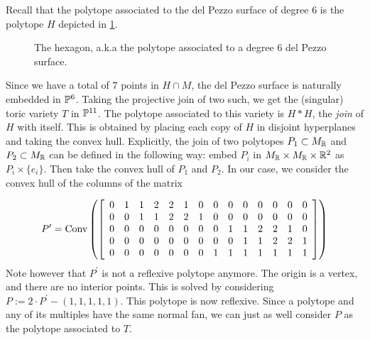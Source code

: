 \documentclass[11pt, english]{article}
\begin{document}
Recall that the polytope associated to the del Pezzo surface of degree $6$ is the polytope $H$ depicted in \ref{fig:hexagon}. 

\begin{figure}[ht]
\label{fig:hexagon}
\centering
{}
\caption{The hexagon, a.k.a the polytope associated to a degree 6 del Pezzo surface.}
\end{figure}
 
Since we have a total of $7$ points in $H \cap M$, the del Pezzo surface is naturally embedded in $\mathbb{P}^6$. Taking the projective join of two such, we get the (singular) toric variety $T$ in $\mathbb{P}^{11}$. The polytope associated to this variety is $H \ast H$, the \emph{join} of $H$ with itself. This is obtained by placing each copy of $H$ in disjoint hyperplanes and taking the convex hull. Explicitly, the join of two polytopes $P_1 \subset M_{\mathbb{R}}$ and $P_2 \subset M_{\mathbb{R}}$ can be defined in the following way: embed $P_i$ in $M_{\mathbb{R}} \times M_{\mathbb{R}} \times \mathbb{R}^2$ as $P_i \times \{e_i\}$. Then take the convex hull of $P_1$ and $P_2$. In our case, we consider the convex hull of the columns of the  matrix

\[
P^\prime = \Conv \left( \left[
\begin{array}{*{14}c}
0 & 1 & 1 & 2 & 2 & 1 & 0 & 0 & 0 & 0 & 0 & 0 & 0 & 0 \\
0 & 0 & 1 & 1 & 2 & 2 & 1 & 0 & 0 & 0 & 0 & 0 & 0 & 0 \\
0 & 0 & 0 & 0 & 0 & 0 & 0 & 0 & 1 & 1 & 2 & 2 & 1 & 0 \\
0 & 0 & 0 & 0 & 0 & 0 & 0 & 0 & 0 & 1 & 1 & 2 & 2 & 1 \\
0 & 0 & 0 & 0 & 0 & 0 & 0 & 1 & 1 & 1 & 1 & 1 & 1 & 1
\end{array} \right] \right)
\]
Note however that $P^\prime$ is not a reflexive polytope anymore. The origin is a vertex, and there are no interior points. This is solved by considering $P := 2 \cdot P^\prime - (1,1,1,1,1)$. This polytope is now reflexive. Since a polytope and any of its multiples have the same normal fan, we can just as well consider $P$ as the polytope associated to $T$.
\end{document}
